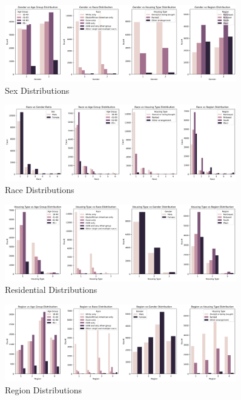 \documentclass{article}
\begin{document}
\begin{figure}[!h]
	\centering
	\includegraphics[width=0.9\textwidth]{../Image/sex_distributions.png}
	\caption{Sex Distributions}
	\label{fig:sex_distributions}
\end{figure}
\newpage
\begin{figure}[!h]
	\centering
	\includegraphics[width=0.9\textwidth]{../Image/race_distributions.png}
	\caption{Race Distributions}
	\label{fig:race_distributions}
\end{figure}
\begin{figure}[!h]
	\centering
	\includegraphics[width=0.9\textwidth]{../Image/house_distributions.png}
	\caption{Residential Distributions}
	\label{fig:house_distributions}
\end{figure}
\begin{figure}[!h]
	\centering
	\includegraphics[width=0.9\textwidth]{../Image/region_distributions.png}
	\caption{Region Distributions}
	\label{fig:region_distributions}
\end{figure}
\end{document}
